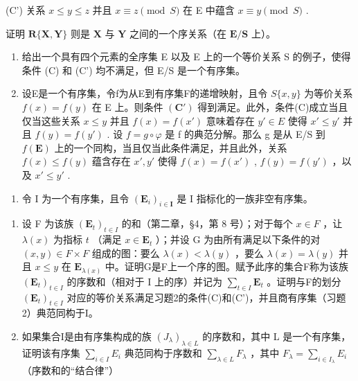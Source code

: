 (C') 关系 \(x \leqslant y \leqslant z\) 并且 \(x \equiv z \pmod{S}\) 在 E 中蕴含 \(x \equiv y \pmod{S}\) .

证明 \(\mathbf{R}\{\mathbf{X},\mathbf{Y}\}\) 则是 \(\mathbf{X}\) 与 \(\mathbf{Y}\) 之间的一个序关系（在 \(\mathbf{E} / \mathbf{S}\) 上）。

\begin{enumerate}
\def\labelenumi{(\alph{enumi})}
\setcounter{enumi}{4}
\item
  给出一个具有四个元素的全序集 E 以及 E 上的一个等价关系 S 的例子，使得条件 (C) 和 (C') 均不满足，但 E/S 是一个有序集。
\item
  设E是一个有序集，令f为从E到有序集F的递增映射，且令 \(S\{x,y\}\) 为等价关系 \(f(x)=f(y)\) 在 E 上。则条件 \((\mathbf{C}')\) 得到满足。此外，条件(C)成立当且仅当这些关系 \(x\leqslant y\) 并且 \(f(x)=f(x')\) 意味着存在 \(y'\in E\) 使得 \(x'\leqslant y'\) 并且 \(f(y)=f(y')\) . 设 \(f=g\circ\varphi\) 是 f 的典范分解。那么 g 是从 E/S 到 \(f(\mathbf{E})\) 上的一个同构，当且仅当此条件满足，并且此外，关系 \(f(x)\leqslant f(y)\) 蕴含存在 \(x',y'\) 使得 \(f(x)=f(x')\) , \(f(y)=f(y')\) ，以及 \(x'\leqslant y'\) .
\end{enumerate}

\begin{enumerate}
\def\labelenumi{\arabic{enumi}.}
\setcounter{enumi}{2}
\tightlist
\item
  令 I 为一个有序集，且令 \((\mathbf{E}_i)_{i\in \mathbf{I}}\) 是 I 指标化的一族非空有序集。
\end{enumerate}

\begin{enumerate}
\def\labelenumi{(\alph{enumi})}
\item
  设 F 为该族 \((\mathbf{E}_t)_{t \in I}\) 的和（第二章，§4，第 8 号）；对于每个 \(x \in F\) ，让 \(\lambda(x)\) 为指标 \(t\) （满足 \(x \in \mathbf{E}_t\) ）；并设 G 为由所有满足以下条件的对 \((x, y) \in F \times F\) 组成的图：要么 \(\lambda(x) < \lambda(y)\) ，要么 \(\lambda(x) = \lambda(y)\) 并且 \(x \leqslant y\) 在 \(\mathbf{E}_{\lambda(x)}\) 中。证明G是F上一个序的图。赋予此序的集合F称为该族 \((\mathbf{E}_t)_{t \in I}\) 的序数和（相对于 I 上的序）并记为 \(\sum_{t \in I} \mathbf{E}_t\) 。证明与F的划分 \((\mathbf{E}_t)_{t \in I}\) 对应的等价关系满足习题2的条件(C)和(C')，并且商有序集（习题2）典范同构于I。
\item
  如果集合I是由有序集构成的族 \((J_{\lambda})_{\lambda\in L}\) 的序数和，其中 L 是一个有序集，证明该有序集 \(\sum_{i\in I}E_{i}\) 典范同构于序数和 \(\sum_{\lambda\in L}F_{\lambda}\) ，其中 \(F_{\lambda}=\sum_{i\in I_{\lambda}}E_{i}\) （序数和的“结合律”）
\end{enumerate}

